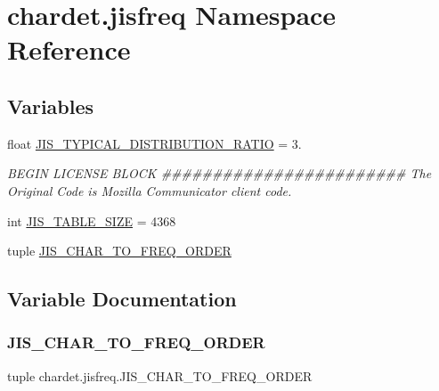 \hypertarget{namespacechardet_1_1jisfreq}{}\section{chardet.\+jisfreq Namespace Reference}
\label{namespacechardet_1_1jisfreq}
\subsection*{Variables}
\begin{DoxyCompactItemize}
\item 
float \hyperlink{namespacechardet_1_1jisfreq_a0786e8f75963476a3aed7cfab754746f}{J\+I\+S\+\_\+\+T\+Y\+P\+I\+C\+A\+L\+\_\+\+D\+I\+S\+T\+R\+I\+B\+U\+T\+I\+O\+N\+\_\+\+R\+A\+T\+IO} = 3.
\begin{DoxyCompactList}\small\item\em B\+E\+G\+IN L\+I\+C\+E\+N\+SE B\+L\+O\+CK \#\#\#\#\#\#\#\#\#\#\#\#\#\#\#\#\#\#\#\#\#\#\#\# The Original Code is Mozilla Communicator client code. \end{DoxyCompactList}\item 
int \hyperlink{namespacechardet_1_1jisfreq_ac347ecf8dd90f7d914686bd13bd69450}{J\+I\+S\+\_\+\+T\+A\+B\+L\+E\+\_\+\+S\+I\+ZE} = 4368
\item 
tuple \hyperlink{namespacechardet_1_1jisfreq_a34cedaa649fb25d775de95e137ad4df7}{J\+I\+S\+\_\+\+C\+H\+A\+R\+\_\+\+T\+O\+\_\+\+F\+R\+E\+Q\+\_\+\+O\+R\+D\+ER}
\end{DoxyCompactItemize}


\subsection{Variable Documentation}
\mbox{\label{namespacechardet_1_1jisfreq_a34cedaa649fb25d775de95e137ad4df7}} 
\subsubsection{\texorpdfstring{J\+I\+S\+\_\+\+C\+H\+A\+R\+\_\+\+T\+O\+\_\+\+F\+R\+E\+Q\+\_\+\+O\+R\+D\+ER}{JIS\_CHAR\_TO\_FREQ\_ORDER}}
{\footnotesize\ttfamily tuple chardet.\+jisfreq.\+J\+I\+S\+\_\+\+C\+H\+A\+R\+\_\+\+T\+O\+\_\+\+F\+R\+E\+Q\+\_\+\+O\+R\+D\+ER}

